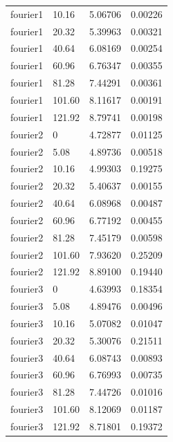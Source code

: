 \begin{onehalfspace}
\begin{longtable}{p{2.0cm} p{2.0cm} p{4.0cm} p{2.0cm} }
        fourier1  & 10.16        & 5.06706          & 0.00226 \\
        fourier1  & 20.32        & 5.39963          & 0.00321 \\
        fourier1  & 40.64        & 6.08169          & 0.00254 \\
        fourier1  & 60.96        & 6.76347          & 0.00355 \\
        fourier1  & 81.28        & 7.44291          & 0.00361 \\
        fourier1  & 101.60       & 8.11617          & 0.00191 \\
        fourier1  & 121.92       & 8.79741          & 0.00198 \\
        \midrule
        fourier2  & 0            & 4.72877          & 0.01125 \\
        fourier2  & 5.08         & 4.89736          & 0.00518 \\
        fourier2  & 10.16        & 4.99303          & 0.19275 \\
        fourier2  & 20.32        & 5.40637          & 0.00155 \\
        fourier2  & 40.64        & 6.08968          & 0.00487 \\
        fourier2  & 60.96        & 6.77192          & 0.00455 \\
        fourier2  & 81.28        & 7.45179          & 0.00598 \\
        fourier2  & 101.60       & 7.93620          & 0.25209 \\
        fourier2  & 121.92       & 8.89100          & 0.19440 \\
        \midrule
        fourier3  & 0            & 4.63993          & 0.18354 \\
        fourier3  & 5.08         & 4.89476          & 0.00496 \\
        fourier3  & 10.16        & 5.07082          & 0.01047 \\
        fourier3  & 20.32        & 5.30076          & 0.21511 \\
        fourier3  & 40.64        & 6.08743          & 0.00893 \\
        fourier3  & 60.96        & 6.76993          & 0.00735 \\
        fourier3  & 81.28        & 7.44726          & 0.01016 \\
        fourier3  & 101.60       & 8.12069          & 0.01187 \\
        fourier3  & 121.92       & 8.71801          & 0.19372 \\

\end{longtable}
\end{onehalfspace}
